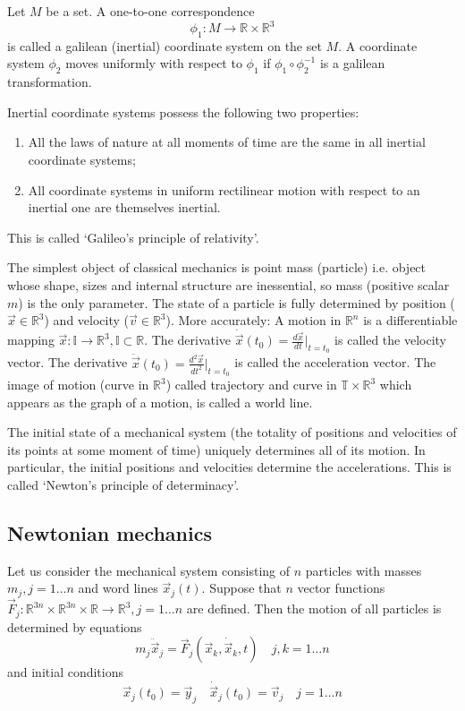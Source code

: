 Let $M$ be a set. A one-to-one correspondence 
\[\phi_1: M \rightarrow \mathbb{R} \times \mathbb{R}^3\]
is called a galilean (inertial) coordinate system on the set $M$. A coordinate system $\phi_2$ moves
uniformly with respect to $\phi_1$  if $\phi_1\circ\phi_2^{-1}$ is a galilean
transformation. 

Inertial coordinate systems  possess the following two properties:
\begin{enumerate}
    \item All the laws of nature at all moments of time are the same in all inertial coordinate systems;
    \item  All coordinate systems in uniform rectilinear motion with respect to an inertial one are themselves inertial.
\end{enumerate}
This is called `Galileo's principle of relativity'.

The simplest object of classical mechanics is point mass (particle) i.e. object whose shape, 
sizes and internal structure are inessential, so mass (positive scalar $m$) is the only parameter. 
The state of a particle is fully determined by position ($\vec x \in\mathbb{R}^3$) 
and velocity ($\vec v \in\mathbb{R}^3$). 
More accurately: A motion in $\mathbb{R}^n$ is a differentiable mapping 
$\vec x: \mathbb{I}\rightarrow \mathbb{R}^3, \mathbb{I} \subset \mathbb{R}$. 
The derivative $\dot \vec{x}(t_0)=\frac{d\vec x}{dt}|_{t=t_0}$ is called the velocity vector. 
The derivative $\ddot \vec x(t_0)=\frac{ d^2 \vec x}{dt^2}|_{t=t_0}$ is called the acceleration vector. 
The image of motion (curve in $\mathbb{R}^3$) called trajectory and  curve in 
$\mathbb{T} \times \mathbb{R}^3$ which appears  as the graph of a motion, is called a world line.

The initial state of a mechanical system (the totality of positions and
velocities of its points at some moment of time) uniquely determines all of
its motion. In particular, the initial positions and velocities determine the accelerations.
This is called `Newton's principle of determinacy'.

\subsection{Newtonian mechanics}
\label{newt-mech}

Let us consider the mechanical system consisting of $n$ particles 
with masses $m_j,j=1\ldots n$ and word lines $\vec x_j(t)$.
Suppose that $n$ vector functions  
$\vec F_j:\mathbb{R}^{3 n}\times\mathbb{R}^{3 n}\times\mathbb{R}\rightarrow\mathbb{R}^3,j=1\ldots n$ 
are defined. Then the motion of all particles is determined by equations
\begin{equation}
  \label {newtoneq}
    m_j \ddot \vec x_j=\vec F_j(\vec x_k,\dot \vec x_k,t) \quad j,k=1\ldots n 
\end{equation}
and initial conditions
\begin{equation}
\label {newtonic}
   \vec x_j(t_0)=\vec y_j\quad\dot \vec x_j(t_0)=\vec v_j  \quad j=1\ldots n \end{equation}

